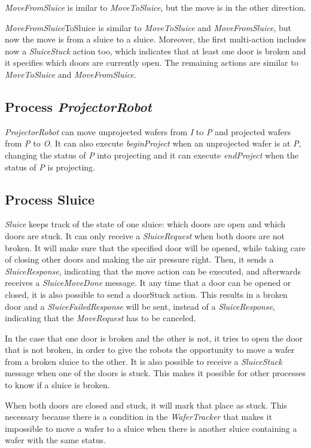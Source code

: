  \emph{MoveFromSluice} is imilar to \emph{MoveToSluice}, but the move is in the other direction.


 \emph{MoveFromSluice}ToSluice is similar to \emph{MoveToSluice} and \emph{MoveFromSluice}, but now the move is from a
 sluice to a sluice. Moreover, the first multi-action includes now a
 \emph{SluiceStuck} action too, which indicates that at least one door is broken and
 it specifies which doors are currently open. The remaining actions are
 similar to \emph{MoveToSluice} and \emph{MoveFromSluice}.

 
\subsection{Process \emph{ProjectorRobot}}


 \emph{ProjectorRobot} can move unprojected wafers from \emph{I} to \emph{P} and projected wafers
 from \emph{P} to \emph{O}. It can also execute \emph{beginProject} when an unprojected wafer is
 at \emph{P}, changing the status of \emph{P} into projecting and it can execute \emph{endProject}
 when the status of \emph{P} is projecting.

\subsection{Process Sluice}


 \emph{Sluice} keeps track of the state of one sluice: which doors are open and
 which doors are stuck. It can only receive a \emph{SluiceRequest} when both doors
 are not broken. It will make sure that the specified door will be opened,
 while taking care of closing other doors and making the air pressure right.
 Then, it sends a \emph{SluiceResponse}, indicating that the move action can be
 executed, and afterwards receives a \emph{SluiceMoveDone} message. It any time that
 a door can be opened or closed, it is also possible to send a doorStuck
 action. This results in a broken door and a \emph{SluiceFailedResponse} will be
 sent, instead of a \emph{SluiceResponse}, indicating that the \emph{MoveRequest} has to
 be canceled.
 
 In the case that one door is broken and the other is not, it tries to open
 the door that is not broken, in order to give the robots the opportunity
 to move a wafer from a broken sluice to the other.
 It is also possible to receive a \emph{SluiceStuck} message when one of the doors
 is stuck. This makes it possible for other processes to know if a sluice is
 broken.
 
 When both doors are closed and stuck, it will mark that place as stuck. This
 necessary because there is a condition in the \emph{WaferTracker} that makes it
 impossible to move a wafer to a sluice when there is another sluice
 containing a wafer with the same status.
